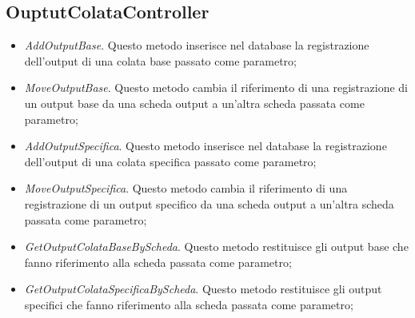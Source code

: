   \subsection{OuptutColataController}
  \begin{itemize}
    \item \textit{AddOutputBase}. Questo metodo inserisce nel database la registrazione dell'output di una colata base
    passato come parametro;
    \item \textit{MoveOutputBase}. Questo metodo cambia il riferimento di una registrazione di un output base da una
    scheda output a un'altra scheda passata come parametro;
    \item \textit{AddOutputSpecifica}. Questo metodo inserisce nel database la registrazione dell'output di una colata
    specifica passato come parametro;
    \item \textit{MoveOutputSpecifica}. Questo metodo cambia il riferimento di una registrazione di un output specifico
    da una scheda output a un'altra scheda passata come parametro;
    \item \textit{GetOutputColataBaseByScheda}. Questo metodo restituisce gli output base che fanno riferimento alla
    scheda passata come parametro;
    \item \textit{GetOutputColataSpecificaByScheda}. Questo metodo restituisce gli output specifici che fanno riferimento alla
    scheda passata come parametro;
  \end{itemize}

